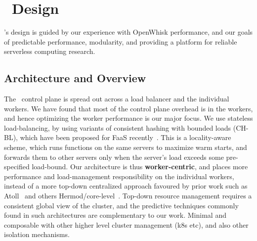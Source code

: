 \section{\sysname~Design}
\label{sec:design}


\sysname's design is guided by our experience with OpenWhisk performance, and our goals of predictable performance, modularity, and providing a platform for reliable serverless computing research.

\subsection{Architecture and Overview}

The \sysname~control plane is spread out across a load balancer and the individual workers.
We have found that most of the control plane overhead is in the workers, and hence optimizing the worker performance is our major focus.
We use stateless load-balancing, by using variants of consistent hashing with bounded loads (CH-BL), which have been proposed for FaaS recently~\cite{fuerst-hpdc23}.
This is a locality-aware scheme, which runs functions on the same servers to maximize warm starts, and forwards them to other servers only when the server's load exceeds some pre-specified load-bound.
Our architecture is thus \textbf{worker-centric}, and places more performance and load-management responsibility on the individual workers, instead of a more top-down centralized approach favoured by prior work such as Atoll~\cite{} and others Hermod/core-level~\cite{}. 
Top-down resource management requires a consistent global view of the cluster, and the predictive techniques commonly found in such architectures are complementary to our work.
Minimal and composable with other higher level cluster management (k8s etc), and also other isolation mechanisms.


